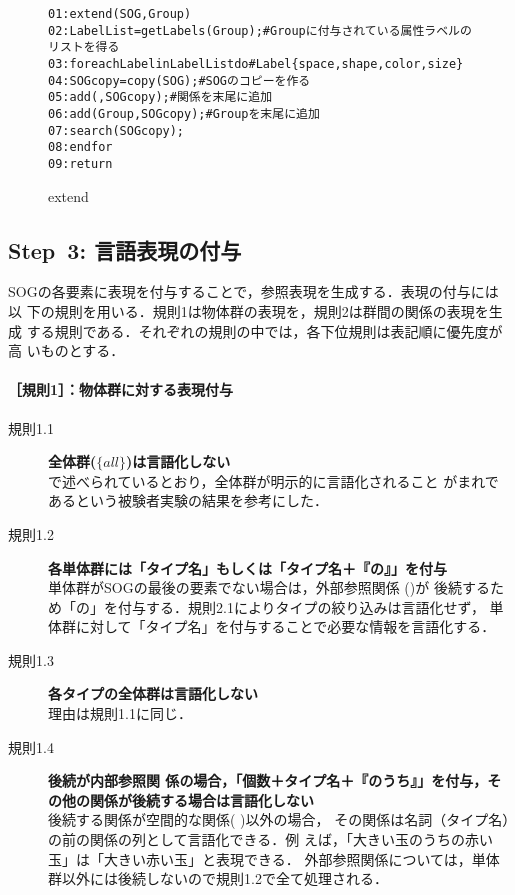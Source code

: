 \documentclass[japanese]{jnlp_1.2}
\def\rel#1{}
\def\mrel#1{}
\def\oneof{}
\def\extrel{}
\begin{document}
\begin{center}
\begin{figure}[t]
    {\small \setlength{\baselineskip}{13pt}
\begin{alltt}
01:extend(SOG, Group)
02:  LabelList = getLabels(Group);     # Groupに付与されている属性ラベルのリストを得る
03:  for each Label in LabelList do    # Label\oneof\{space, shape, color, size\}
04:    SOGcopy = copy(SOG);            # SOGのコピーを作る
05:    add(\rel{\mathtt{Label}}, SOGcopy);              # 関係を末尾に追加
06:    add(Group, SOGcopy);            # Groupを末尾に追加
07:    search(SOGcopy);
08:  end for
09:return
\end{alltt}
}
\caption{extend}
\label{fig:extend}
\end{figure}

\end{center}


\subsection*{Step~3: 言語表現の付与}\label{subsec:MakeExp}

SOGの各要素に表現を付与することで，参照表現を生成する．表現の付与には以
下の規則を用いる．規則1は物体群の表現を，規則2は群間の関係の表現を生成
する規則である．それぞれの規則の中では，各下位規則は表記順に優先度が高
いものとする．

\paragraph{［規則1］：物体群に対する表現付与}
\begin{description}
\item[規則1.1] \textbf{全体群($\{all\}$)は言語化しない}\\
  \cite{KF2006}で述べられているとおり，全体群が明示的に言語化されること
  がまれであるという被験者実験の結果を参考にした．
\item[規則1.2] \textbf{各単体群には「タイプ名」もしくは「タイプ名＋『の』」を付与}\\
  単体群がSOGの最後の要素でない場合は，外部参照関係 (\extrel)が
  後続するため「の」を付与する．規則2.1によりタイプの絞り込みは言語化せず，
  単体群に対して「タイプ名」を付与することで必要な情報を言語化する．
\item[規則1.3] \textbf{各タイプの全体群は言語化しない}\\
  理由は規則1.1に同じ．
\item[規則1.4] \textbf{
後続が内部参照関
    係$\mrel{space}$の場合，「個数＋タイプ名＋『のうち』」を付与，そ
    の他の関係が後続する場合は言語化しない}\\
  後続する関係が空間的な関係($\mrel{space}$
)以外の場合，
  その関係は名詞（タイプ名）の前の関係の列として言語化できる．例
  えば，「大きい玉のうちの赤い玉」は「大きい赤い玉」と表現できる．
外部参照関係については，単体群以外には後続しないので規則1.2で全て処理される．
\end{description}
\end{document}
